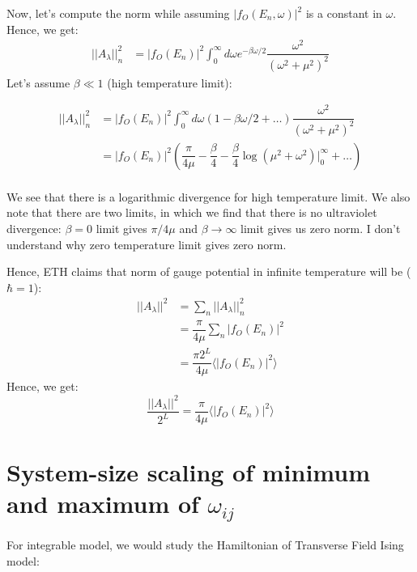\documentclass[11pt,a4paper]{article}
\begin{document}
Now, let's compute the norm while assuming $ |f_O(E_n, \omega)|^2 $ is a constant in $\omega$. Hence, we get:
\begin{align*}
||A_{\lambda}||^2_{n} &=  |f_O(E_n)|^2 \int_0^{\infty} d \omega e^{-\beta \omega/2} \dfrac{\omega^2}{(\omega^2 + \mu^2)^2} 
\end{align*}
Let's assume $\beta \ll 1$ (high temperature limit):

\begin{align*}
||A_{\lambda}||^2_{n} &=  |f_O(E_n)|^2 \int_0^{\infty} d \omega \left(1-\beta \omega/2 + \ldots \right) \dfrac{\omega^2}{(\omega^2 + \mu^2)^2}  \\
&=|f_O(E_n)|^2\left(\dfrac{\pi}{4 \mu}-\dfrac{\beta }{4}-\dfrac{\beta }{4} \log (\mu^2+ \omega^2)|_0^{\infty}  + \ldots \right) \\
\end{align*}

We see that there is a logarithmic divergence for high temperature limit. We also note that there are two limits, in which we find that there is no ultraviolet divergence: $\beta =0$ limit gives $\pi/ 4 \mu$ and $\beta \rightarrow \infty$ limit gives us zero norm. I don't understand why zero temperature limit gives zero norm.


Hence, ETH claims that norm of gauge potential in infinite temperature will be ($\hbar=1$):
\begin{align*}
||A_{\lambda}||^2 &= \sum_n ||A_{\lambda}||^2_{n} \\
&= \dfrac{\pi}{4 \mu} \sum_n |f_O(E_n)|^2\\
&= \dfrac{\pi 2^L}{4 \mu} \langle |f_O(E_n)|^2  \rangle
\end{align*}
Hence, we get:
\begin{equation}
\boxed{
\dfrac{||A_{\lambda}||^2} {2^L}= \dfrac{\pi }{4 \mu} \langle |f_O(E_n)|^2  \rangle}
\end{equation}



\section{System-size scaling of minimum and maximum of $\omega_{ij}$}
For integrable model, we would study the Hamiltonian of Transverse Field Ising model:
\end{document}
